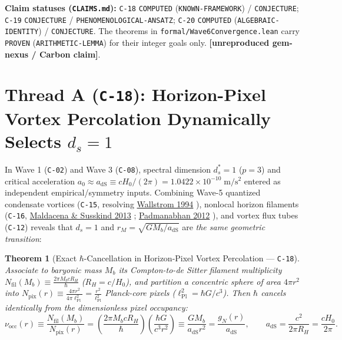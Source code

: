\documentclass[11pt,letterpaper]{article}
\newtheorem{theorem}{Theorem}
\newcommand{\unrepro}{\textbf{\textcolor{red!60!black}{[unreproduced gem-nexus / Carbon claim]}}}
\begin{document}
{\sloppy \textbf{Claim statuses (\texttt{CLAIMS.md}):} \texttt{C-18} \texttt{COMPUTED} (\texttt{KNOWN-FRAMEWORK}) / \texttt{CONJECTURE}; \texttt{C-19} \texttt{CONJECTURE} / \texttt{PHENOMENOLOGICAL-\allowbreak ANSATZ}; \texttt{C-20} \texttt{COMPUTED} (\texttt{ALGEBRAIC-\allowbreak IDENTITY}) / \texttt{CONJECTURE}. The theorems in \texttt{formal/Wave6Convergence.lean} carry \texttt{PROVEN} (\texttt{ARITHMETIC-LEMMA}) for their integer goals only. \unrepro.\par}

\section{Thread A (\texttt{C-18}): Horizon-Pixel Vortex Percolation Dynamically Selects $d_s = 1$}

In Wave 1 (\texttt{C-02}) and Wave 3 (\texttt{C-08}), spectral dimension $d_s^* = 1$ ($p=3$) and critical acceleration $a_0 \approx a_{\mathrm{dS}} \equiv c H_0 / (2\pi) = 1.0422\times 10^{-10}\;\mathrm{m/s^2}$ entered as independent empirical/symmetry inputs. Combining Wave-5 quantized condensate vortices (\texttt{C-15}, resolving \href{https://link.aps.org/doi/10.1103/PhysRevA.49.1613}{Wallstrom 1994} \cite{Wallstrom1994}), nonlocal horizon filaments (\texttt{C-16}, \href{https://arxiv.org/abs/1306.0533}{Maldacena \& Susskind 2013} \cite{MaldacenaSusskind2013}; \href{https://arxiv.org/abs/1206.4916}{Padmanabhan 2012} \cite{Padmanabhan2012}), and vortex flux tubes (\texttt{C-12}) reveals that $d_s = 1$ and $r_M = \sqrt{G M_b / a_{\mathrm{dS}}}$ are \emph{the same geometric transition}:

\begin{theorem}[Exact $\hbar$-Cancellation in Horizon-Pixel Vortex Percolation --- \texttt{C-18}]
Associate to baryonic mass $M_b$ its Compton-to-de Sitter filament multiplicity $N_{\mathrm{fil}}(M_b) \equiv \frac{2\pi M_b c R_H}{\hbar}$ ($R_H = c/H_0$), and partition a concentric sphere of area $4\pi r^2$ into $N_{\mathrm{pix}}(r) \equiv \frac{4\pi r^2}{4\pi \ell_{\mathrm{Pl}}^2} = \frac{r^2}{\ell_{\mathrm{Pl}}^2}$ Planck-core pixels ($\ell_{\mathrm{Pl}}^2 = \hbar G / c^3$). Then $\hbar$ cancels identically from the dimensionless pixel occupancy:
\begin{equation}
  \nu_{\mathrm{occ}}(r) \equiv \frac{N_{\mathrm{fil}}(M_b)}{N_{\mathrm{pix}}(r)}
  = \left(\frac{2\pi M_b c R_H}{\hbar}\right)\left(\frac{\hbar G}{c^3 r^2}\right)
  \equiv \frac{G M_b}{a_{\mathrm{dS}} r^2} = \frac{g_N(r)}{a_{\mathrm{dS}}},
  \qquad a_{\mathrm{dS}} = \frac{c^2}{2\pi R_H} = \frac{c H_0}{2\pi}.
  \label{eq:percolation}
\end{equation}
\end{theorem}
\end{document}
